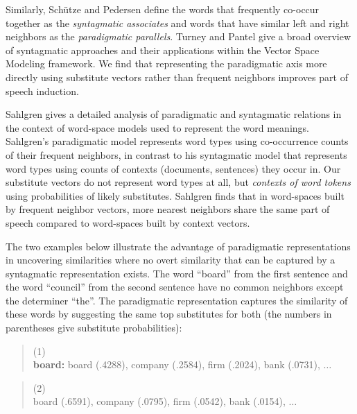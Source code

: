 Similarly, Sch{\"u}tze and Pedersen  define the
words that frequently co-occur together as the {\em syntagmatic
  associates} and words that have similar left and right neighbors as
the {\em paradigmatic parallels}.  Turney and Pantel
 give a broad overview of
syntagmatic approaches and their applications within the Vector Space
Modeling framework.  We find that representing the paradigmatic axis
more directly using substitute vectors rather than frequent neighbors
improves part of speech induction.

Sahlgren  gives a detailed analysis of
paradigmatic and syntagmatic relations in the context of word-space
models used to represent the word meanings.  Sahlgren's paradigmatic
model represents word types using co-occurrence counts of their
frequent neighbors, in contrast to his syntagmatic model that
represents word types using counts of contexts (documents, sentences)
they occur in.  Our substitute vectors do not represent word types at
all, but {\em contexts of word tokens} using probabilities of likely
substitutes.  Sahlgren finds that in word-spaces built by frequent
neighbor vectors, more nearest neighbors share the same part of speech
compared to word-spaces built by context vectors.

The two examples below illustrate the advantage of paradigmatic
representations in uncovering similarities where no overt similarity
that can be captured by a syntagmatic representation exists.  The word
``board'' from the first sentence and the word ``council'' from the
second sentence have no common neighbors except the determiner
``the''.  The paradigmatic representation captures the similarity of
these words by suggesting the same top substitutes for both (the
numbers in parentheses give substitute probabilities):
\begin{quote}
 (1) \\
 {\bf board:} board (.4288), company (.2584), firm (.2024), bank (.0731), $\ldots$
\end{quote}

\begin{quote}
  (2) \\
  board (.6591), company (.0795), firm (.0542), bank (.0154), $\ldots$
\end{quote}

